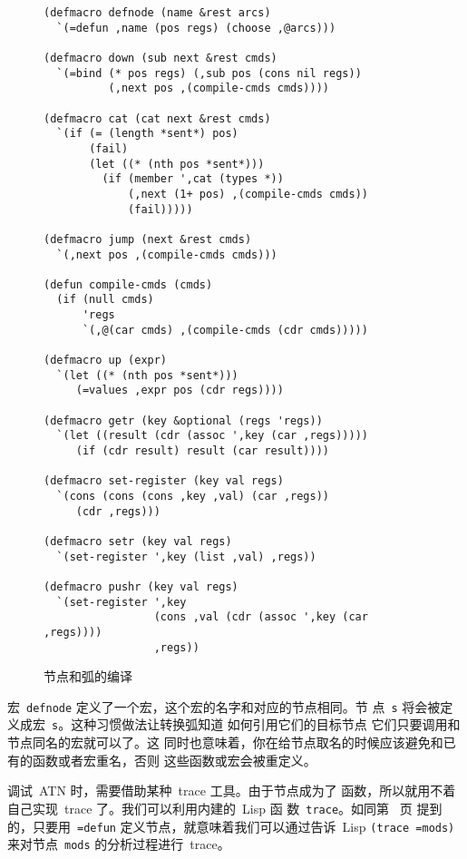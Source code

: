 \begin{figure}
\begin{lstlisting}
(defmacro defnode (name &rest arcs)
  `(=defun ,name (pos regs) (choose ,@arcs)))

(defmacro down (sub next &rest cmds)
  `(=bind (* pos regs) (,sub pos (cons nil regs))
          (,next pos ,(compile-cmds cmds))))

(defmacro cat (cat next &rest cmds)
  `(if (= (length *sent*) pos)
       (fail)
       (let ((* (nth pos *sent*)))
         (if (member ',cat (types *))
             (,next (1+ pos) ,(compile-cmds cmds))
             (fail)))))

(defmacro jump (next &rest cmds)
  `(,next pos ,(compile-cmds cmds)))

(defun compile-cmds (cmds)
  (if (null cmds)
      'regs
      `(,@(car cmds) ,(compile-cmds (cdr cmds)))))

(defmacro up (expr)
  `(let ((* (nth pos *sent*)))
     (=values ,expr pos (cdr regs))))

(defmacro getr (key &optional (regs 'regs))
  `(let ((result (cdr (assoc ',key (car ,regs)))))
     (if (cdr result) result (car result))))

(defmacro set-register (key val regs)
  `(cons (cons (cons ,key ,val) (car ,regs))
	 (cdr ,regs)))

(defmacro setr (key val regs)
  `(set-register ',key (list ,val) ,regs))

(defmacro pushr (key val regs)
  `(set-register ',key
                 (cons ,val (cdr (assoc ',key (car ,regs))))
                 ,regs))
\end{lstlisting}
  \caption{节点和弧的编译}
  \label{fig:compilation_of_nodes_and_arcs}
\end{figure}

宏~\texttt{defnode} 定义了一个宏，这个宏的名字和对应的节点相同。节
点~\texttt{s} 将会被定义成宏~\texttt{s}。这种习惯做法让转换弧知道
如何引用它们的目标节点 \pozhehao{} 它们只要调用和节点同名的宏就可以了。这
同时也意味着，你在给节点取名的时候应该避免和已有的函数或者宏重名，否则
这些函数或宏会被重定义。

调试~\textsc{ATN} 时，需要借助某种~trace 工具。由于节点成为了
函数，所以就用不着自己实现~trace 了。我们可以利用内建的~Lisp 函
数~\verb|trace|。如同第~\pageref{trace} 页
提到的，只要用~\verb|=defun| 定义节点，就意味着我们可以通过告诉~Lisp
\verb|(trace =mods)| 来对节点~\verb|mods| 的分析过程进行~trace。

